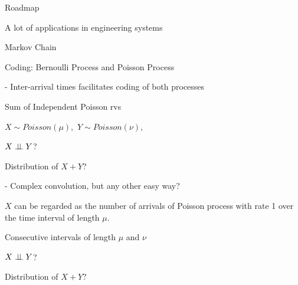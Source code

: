 \documentclass[fleqn,aspectratio=169]{beamer}
\begin{document}
\begin{frame}{Roadmap}

\plitemsep 0.1in

\bci 
\item A lot of applications in engineering systems


\bigskip

\item {}

\medskip
\item {}
\item {}
\item {}

\medskip
\item Markov Chain

\eci 

\end{frame}


\begin{frame}{Coding: Bernoulli Process and Poisson Process}

- Inter-arrival times facilitates coding of both processes

\smallskip
\centering
{}

\smallskip
{}


\end{frame}

\begin{frame}{Sum of Independent Poisson rvs}

\plitemsep 0.1in

\bci 

\item $X \sim Poisson(\mu),$  $Y \sim Poisson(\nu),$  

\item<2->  $X \perp \!\!\! \perp Y$?

\item<3->  Distribution of $X+Y$?

- Complex convolution, but any other easy way?

\item<4-> $X$ can be regarded as the number of arrivals of Poisson process with rate 1 over the time interval of length $\mu.$ 

\item<5-> Consecutive intervals of length $\mu$ and $\nu$

\item<6->  $X \perp \!\!\! \perp Y$? 

\item<7->  Distribution of $X+Y$? 

\eci 


\end{frame}
\end{document}
